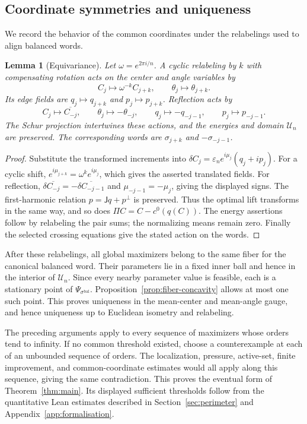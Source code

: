 \documentclass[11pt,reqno]{amsart}
\numberwithin{equation}{section}
\newtheorem{lemma}[theorem]{Lemma}
\theoremstyle{definition}
\theoremstyle{remark}
\newcommand{\dd}{\delta}
\newcommand{\bal}{\mathrm{bal}}
\newcommand{\UU}{\mathscr U_n}
\begin{document}
\subsection{Coordinate symmetries and uniqueness}
We record the behavior of the common coordinates under the relabelings used to align balanced words.

\begin{lemma}[Equivariance]\label{lem:equivariance}
Let $\omega=e^{2\pi i/n}$. A cyclic relabeling by $k$ with compensating rotation acts on the center and angle variables by
\[
 C_j\mapsto\omega^{-k}C_{j+k},\qquad
 \theta_j\mapsto\theta_{j+k}.
\]
Its edge fields are $q_j\mapsto q_{j+k}$ and $p_j\mapsto p_{j+k}$. Reflection acts by
\[
 C_j\mapsto\overline{C_{-j}},\qquad
 \theta_j\mapsto-\theta_{-j},\qquad
 q_j\mapsto-q_{-j-1},\qquad p_j\mapsto p_{-j-1}.
\]
The Schur projection intertwines these actions, and the energies and domain $\UU$ are preserved. The corresponding words are $\sigma_{j+k}$ and $-\sigma_{-j-1}$.
\end{lemma}
\begin{proof}
Substitute the transformed increments into
$\dd C_j=\varepsilon_ne^{i\mu_j}(q_j+ip_j)$.
For a cyclic shift, $e^{i\mu_{j+k}}=\omega^ke^{i\mu_j}$, which gives the asserted translated fields. For reflection,
$\dd\overline{C_{-j}}=-\overline{\dd C_{-j-1}}$ and
$\mu_{-j-1}=-\mu_j$, giving the displayed signs. The first-harmonic relation $p=\mathsf Jq+p^\perp$ is preserved. Thus the optimal lift transforms in the same way, and so does $\Pi C=C-c^0(q(C))$. The energy assertions follow by relabeling the pair sums; the normalizing means remain zero. Finally the selected crossing equations give the stated action on the words.
\end{proof}

After these relabelings, all global maximizers belong to the same fiber for the canonical balanced word. Their parameters lie in a fixed inner ball and hence in the interior of $\UU$. Since every nearby parameter value is feasible, each is a stationary point of $\Psi_{\sigma^{\bal}}$. Proposition~\ref{prop:fiber-concavity} allows at most one such point. This proves uniqueness in the mean-center and mean-angle gauge, and hence uniqueness up to Euclidean isometry and relabeling.

The preceding arguments apply to every sequence of maximizers whose orders tend to infinity. If no common threshold existed, choose a counterexample at each of an unbounded sequence of orders. The localization, pressure, active-set, finite improvement, and common-coordinate estimates would all apply along this sequence, giving the same contradiction. This proves the eventual form of Theorem~\ref{thm:main}. Its displayed sufficient thresholds follow from the quantitative Lean estimates described in Section~\ref{sec:perimeter} and Appendix~\ref{app:formalisation}.
\end{document}

